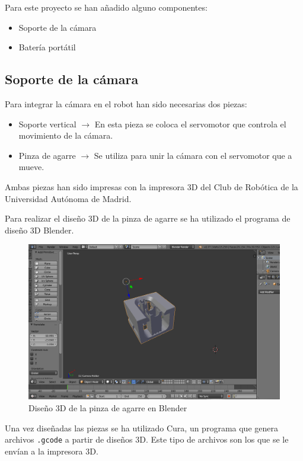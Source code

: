 \documentclass[twoside, 11pt]{epstfg}
\begin{document}
Para este proyecto se han añadido alguno componentes:

\begin{itemize}
	\item Soporte de la cámara
	\item Batería portátil
\end{itemize}

\subsection{Soporte de la cámara}

Para integrar la cámara en el robot han sido necesarias dos piezas:

\begin{itemize}
	\item Soporte vertical $\rightarrow$ En esta pieza se coloca el servomotor que controla el movimiento de la cámara.
	
	\item Pinza de agarre $\rightarrow$ Se utiliza para unir la cámara con el servomotor que a mueve.
\end{itemize}

Ambas piezas han sido impresas con la impresora 3D del Club de Robótica de la Universidad Autónoma de Madrid.

Para realizar el diseño 3D de la pinza de agarre se ha utilizado el programa de diseño 3D Blender.


\begin{figure}[h]
	\centerline{
		\mbox{\includegraphics[width=.80\textwidth]{images/cameraBlender.png}}
	}
	\caption{ Diseño 3D de la pinza de agarre en Blender}
\end{figure}

Una vez diseñadas las piezas se ha utilizado Cura, un programa que genera archivos \texttt{.gcode} a partir de diseños 3D. Este tipo de archivos son los que se le envían a la impresora 3D.
\end{document}
